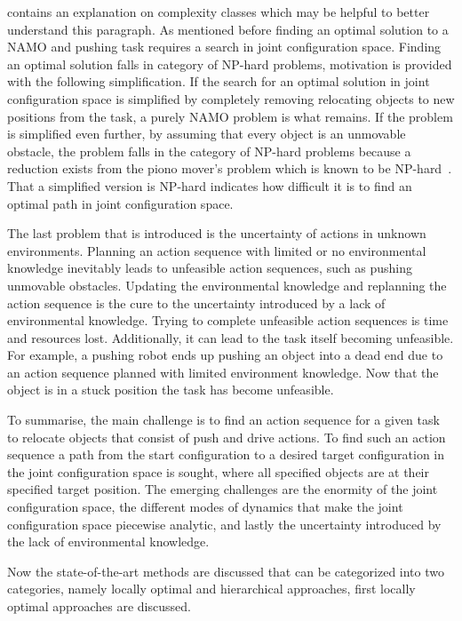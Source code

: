  contains an explanation on complexity classes which may be helpful to better understand this paragraph. As mentioned before finding an optimal solution to a \ac{NAMO} and pushing task requires a search in joint configuration space. Finding an optimal solution falls in category of \ac{NP-hard} problems, motivation is provided with the following simplification. If the search for an optimal solution in joint configuration space is simplified by completely removing relocating objects to new positions from the task, a purely \ac{NAMO} problem is what remains. If the problem is simplified even further, by assuming that every object is an unmovable obstacle, the problem falls in the category of \ac{NP-hard} problems because a reduction exists from the piono mover's problem which is known to be \ac{NP-hard}~\cite{reif_motion_1985}. That a simplified version is \ac{NP-hard} indicates how difficult it is to find an optimal path in joint configuration space.\bs

The last problem that is introduced is the uncertainty of actions in unknown environments. Planning an action sequence with limited or no environmental knowledge inevitably leads to unfeasible action sequences, such as pushing unmovable obstacles. Updating the environmental knowledge and replanning the action sequence is the cure to the uncertainty introduced by a lack of environmental knowledge. Trying to complete unfeasible action sequences is time and resources lost. Additionally, it can lead to the task itself becoming unfeasible. For example, a pushing robot ends up pushing an object into a dead end due to an action sequence planned with limited environment knowledge. Now that the object is in a stuck position the task has become unfeasible.\bs

To summarise, the main challenge is to find an action sequence for a given task to relocate objects that consist of push and drive actions. To find such an action sequence a path from the start configuration to a desired target configuration in the joint configuration space is sought, where all specified objects are at their specified target position. The emerging challenges are the enormity of the joint configuration space, the different modes of dynamics that make the joint configuration space piecewise analytic, and lastly the uncertainty introduced by the lack of environmental knowledge.\bs

Now the state-of-the-art methods are discussed that can be categorized into two categories, namely locally optimal and hierarchical approaches, first locally optimal approaches are discussed.\bs

